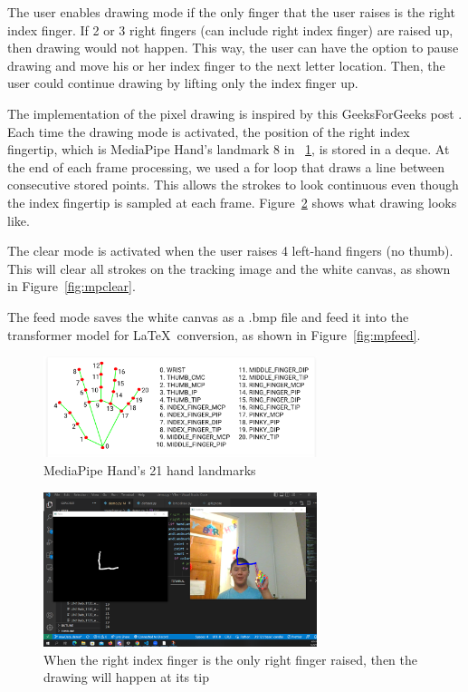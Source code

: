 The user enables drawing mode if the only finger that the user raises is the right index finger. If 2 or 3 right fingers (can include right index finger) are raised up, then drawing would not happen. This way, the user can have the option to pause drawing and move his or her index finger to the next letter location. Then, the user could continue drawing by lifting only the index finger up.  

The implementation of the pixel drawing is inspired by this GeeksForGeeks post \cite{DrawMode}. Each time the drawing mode is activated, the position of the right index fingertip, which is MediaPipe Hand's landmark 8 in ~\ref{fig:mplm},  is stored in a deque. At the end of each frame processing, we used a for loop that draws a line between consecutive stored points. This allows the strokes to look continuous even though the index fingertip is sampled at each frame. Figure~\ref{fig:mpdraw} shows what drawing looks like.



The clear mode is activated when the user raises 4 left-hand fingers (no thumb). This will clear all strokes on the tracking image and the white canvas, as shown in Figure~\ref{fig:mpclear}. 

The feed mode saves the white canvas as a .bmp file and feed it into the transformer model for \LaTeX\ conversion, as shown in Figure~\ref{fig:mpfeed}.

\begin{figure}[h!]
    \centering
    \includegraphics[width=8cm]{images/mplandmarks.png}
    \caption{MediaPipe Hand's 21 hand landmarks}
    \label{fig:mplm}
\end{figure}

\begin{figure}[h!]
    \centering
    \includegraphics[width=8cm]{images/draw.png}
    \caption{When the right index finger is the only right finger raised, then the drawing will happen at its tip}
    \label{fig:mpdraw}
\end{figure}

